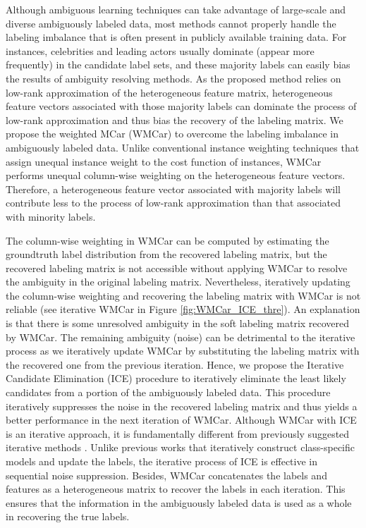 \documentclass[10pt,journal,compsoc]{IEEEtran}
\begin{document}
Although ambiguous learning techniques can take advantage of large-scale and diverse ambiguously labeled data, most methods cannot properly handle the labeling imbalance that is often present in publicly available training data. For instances, celebrities and leading actors usually dominate (appear more frequently) in the candidate label sets, and these majority labels can easily bias the results of ambiguity resolving methods.  As the proposed method relies on low-rank approximation of the heterogeneous feature matrix, heterogeneous feature vectors associated with those majority labels can dominate the process of low-rank approximation and thus bias the recovery of the labeling matrix. We propose the weighted MCar (WMCar) to overcome the labeling imbalance in ambiguously labeled data. Unlike conventional instance weighting techniques \cite{He2009lfi} that assign unequal instance weight to the cost function of instances, WMCar performs unequal column-wise weighting on the heterogeneous feature vectors. Therefore, a heterogeneous feature vector associated with majority labels will contribute less to the process of low-rank approximation than that associated with minority labels.


The column-wise weighting in WMCar can be computed by estimating the groundtruth label distribution from the recovered labeling matrix, but the recovered labeling matrix is not accessible without applying WMCar to resolve the ambiguity in the original labeling matrix.
Nevertheless, iteratively updating the column-wise weighting and recovering the labeling matrix with WMCar is not reliable (see iterative WMCar in Figure \ref{fig:WMCar_ICE_thre}). An explanation is that there is some unresolved ambiguity in the soft labeling matrix recovered by WMCar. The remaining ambiguity (noise) can be detrimental to the iterative process as we iteratively update WMCar by substituting the labeling matrix with the recovered one from the previous iteration.
Hence, we propose the Iterative Candidate Elimination (ICE) procedure to iteratively eliminate the least likely candidates from a portion of the ambiguously labeled data.
This procedure iteratively suppresses the noise in the recovered labeling matrix and thus yields a better performance in the next iteration of WMCar. Although WMCar with ICE is an iterative approach, it is fundamentally different from previously suggested iterative methods \cite{Zeng2013,Chen2013,Chen2014all}. Unlike previous works that iteratively construct class-specific models and update the labels, the iterative process of ICE is effective in sequential noise suppression. Besides, WMCar concatenates the labels and features as a heterogeneous matrix to recover the labels in each iteration. This ensures that the information in the ambiguously labeled data is used as a whole in recovering the true labels.
\end{document}
